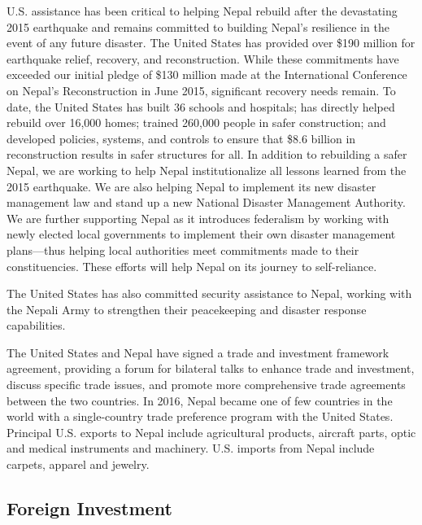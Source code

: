\documentclass[
  openany]{book}
\begin{document}
U.S. assistance has been critical to helping Nepal rebuild after the devastating 2015 earthquake and remains committed to building Nepal's resilience in the event of any future disaster. The United States has provided over \$190 million for earthquake relief, recovery, and reconstruction. While these commitments have exceeded our initial pledge of \$130 million made at the International Conference on Nepal's Reconstruction in June 2015, significant recovery needs remain. To date, the United States has built 36 schools and hospitals; has directly helped rebuild over 16,000 homes; trained 260,000 people in safer construction; and developed policies, systems, and controls to ensure that \$8.6 billion in reconstruction results in safer structures for all. In addition to rebuilding a safer Nepal, we are working to help Nepal institutionalize all lessons learned from the 2015 earthquake. We are also helping Nepal to implement its new disaster management law and stand up a new National Disaster Management Authority. We are further supporting Nepal as it introduces federalism by working with newly elected local governments to implement their own disaster management plans---thus helping local authorities meet commitments made to their constituencies. These efforts will help Nepal on its journey to self-reliance.

The United States has also committed security assistance to Nepal, working with the Nepali Army to strengthen their peacekeeping and disaster response capabilities.

The United States and Nepal have signed a trade and investment framework agreement, providing a forum for bilateral talks to enhance trade and investment, discuss specific trade issues, and promote more comprehensive trade agreements between the two countries. In 2016, Nepal became one of few countries in the world with a single-country trade preference program with the United States. Principal U.S. exports to Nepal include agricultural products, aircraft parts, optic and medical instruments and machinery. U.S. imports from Nepal include carpets, apparel and jewelry.

\hypertarget{foreign-investment}{%
\subsection{Foreign Investment}\label{foreign-investment}}
\end{document}
